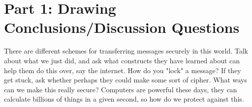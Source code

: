 \documentclass[a4paper]{article}
\begin{document}
\section{Part 1: Drawing Conclusions/Discussion Questions}
There are different schemes for transferring messages securely in this world. Talk about what we just did, and ask what constructs they have learned about can help them do this over, say the internet. How do you "lock" a message? If they get stuck, ask whether perhaps they could make some sort of cipher. What ways can we make this really secure? Computers are powerful these days, they can calculate billions of things in a given second, so how do we protect against this.
\end{document}
